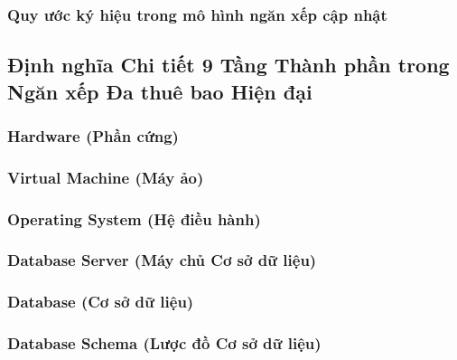 \par{}
\subsubsection{Quy ước ký hiệu trong mô hình ngăn xếp cập nhật}
\label{outline:1:reference-model:8}

\par{}
\subsection{Định nghĩa Chi tiết 9 Tầng Thành phần trong Ngăn xếp Đa thuê bao Hiện đại}
\label{outline:1:reference-model:9}

\par{}
\subsubsection{Hardware (Phần cứng)}
\label{outline:1:reference-model:10}

\par{}
\subsubsection{Virtual Machine (Máy ảo)}
\label{outline:1:reference-model:11}

\par{}
\subsubsection{Operating System (Hệ điều hành)}
\label{outline:1:reference-model:12}

\par{}
\subsubsection{Database Server (Máy chủ Cơ sở dữ liệu)}
\label{outline:1:reference-model:13}

\par{}
\subsubsection{Database (Cơ sở dữ liệu)}
\label{outline:1:reference-model:14}

\par{}
\subsubsection{Database Schema (Lược đồ Cơ sở dữ liệu)}
\label{outline:1:reference-model:15}

